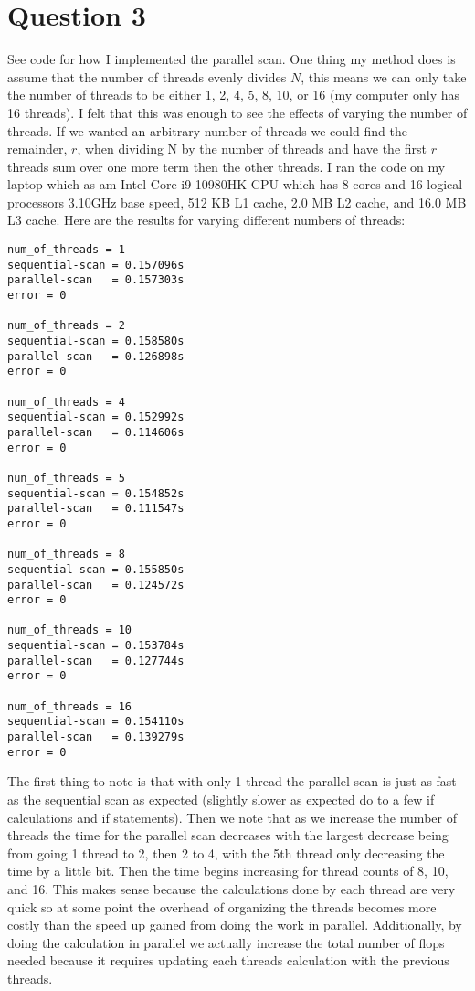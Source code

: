 \documentclass{article}
\begin{document}
\section*{Question 3}
See code for how I implemented the parallel scan. One thing my method does is assume that the number of threads evenly divides $N$, this means we can only take the number of threads to be either 1, 2, 4, 5, 8, 10, or 16 (my computer only has 16 threads). I felt that this was enough to see the effects of varying the number of threads. If we wanted an arbitrary number of threads we could find the remainder, $r$,  when dividing N by the number of threads and have the first $r$ threads sum over one more term then the other threads. I ran the code on my laptop which as am Intel Core i9-10980HK CPU which has 8 cores and 16 logical processors 3.10GHz base speed, 512 KB L1 cache, 2.0 MB L2 cache, and 16.0 MB L3 cache. Here are the results for varying different numbers of threads:
\begin{verbatim}
num_of_threads = 1
sequential-scan = 0.157096s
parallel-scan   = 0.157303s
error = 0

num_of_threads = 2
sequential-scan = 0.158580s
parallel-scan   = 0.126898s
error = 0

num_of_threads = 4
sequential-scan = 0.152992s
parallel-scan   = 0.114606s
error = 0

nun_of_threads = 5
sequential-scan = 0.154852s
parallel-scan   = 0.111547s
error = 0

num_of_threads = 8
sequential-scan = 0.155850s
parallel-scan   = 0.124572s
error = 0

num_of_threads = 10
sequential-scan = 0.153784s
parallel-scan   = 0.127744s
error = 0

num_of_threads = 16
sequential-scan = 0.154110s
parallel-scan   = 0.139279s
error = 0
\end{verbatim}

The first thing to note is that with only 1 thread the parallel-scan is just as fast as the sequential scan as expected (slightly slower as expected do to a few if calculations and if statements). Then we note that as we increase the number of threads the time for the parallel scan decreases with the largest decrease being from going 1 thread to 2, then 2 to 4, with the 5th thread only decreasing the time by a little bit. Then the time begins increasing for thread counts of 8, 10, and 16. This makes sense because the calculations done by each thread are very quick so at some point the overhead of organizing the threads becomes more costly than the speed up gained from doing the work in parallel. Additionally, by doing the calculation in parallel we actually increase the total number of flops needed because it requires updating each threads calculation with the previous threads. 
\end{document}
